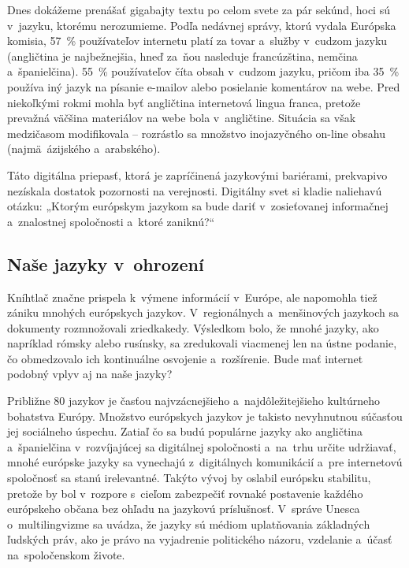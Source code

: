 \begin{multicols}{2}
Dnes dokážeme prenášať gigabajty textu po celom svete za pár
sekúnd, hoci sú v~jazyku, ktorému nerozumieme. Podľa nedávnej
správy, ktorú vydala Európska komisia, 57~\% používateľov
internetu platí za tovar a~služby v~cudzom jazyku (angličtina je
najbežnejšia, hneď za~ňou nasleduje francúzština, nemčina
a~španielčina). 55~\% používateľov číta obsah v~cudzom jazyku,
pričom iba 35~\% používa iný jazyk na písanie e-mailov alebo
posielanie komentárov na webe\cite{EC1}. Pred
niekoľkými rokmi mohla byť angličtina internetová lingua franca,
pretože prevažná väčšina materiálov na webe bola v~angličtine.
Situácia sa však medzičasom modifikovala – rozrástlo sa množstvo
inojazyčného on-line obsahu (najmä~ázijského a~arabského).

Táto digitálna priepasť, ktorá je zapríčinená jazykovými
bariérami, prekvapivo nezískala dostatok pozornosti na verejnosti.
Digitálny svet si kladie naliehavú otázku: „Ktorým európskym
jazykom sa bude dariť v~zosieťovanej informačnej a~znalostnej
spoločnosti a~ktoré zaniknú?“

\subsection{Naše jazyky v~ohrození}
Kníhtlač značne prispela k~výmene informácií v~Európe, ale napomohla tiež zániku mnohých európskych jazykov. V~regionálnych a~menšinových jazykoch sa dokumenty rozmnožovali zriedkakedy. Výsledkom bolo, že mnohé jazyky, ako napríklad rómsky alebo rusínsky, sa zredukovali viacmenej len na ústne podanie, čo obmedzovalo ich kontinuálne osvojenie a~rozšírenie. Bude mať internet podobný vplyv aj na naše jazyky?


Približne 80 jazykov je časťou najvzácnejšieho a~najdôležitejšieho kultúrneho bohatstva Európy. Množstvo európskych jazykov je takisto nevyhnutnou súčasťou jej sociálneho úspechu\cite{EC2}. Zatiaľ čo sa budú populárne jazyky ako angličtina a~španielčina v~rozvíjajúcej sa digitálnej spoločnosti a~na~trhu určite udržiavať, mnohé európske jazyky sa vynechajú z~digitálnych komunikácií a~pre internetovú spoločnosť sa stanú irelevantné. Takýto vývoj by oslabil európsku stabilitu, pretože by bol v~rozpore  s~cieľom zabezpečiť rovnaké postavenie každého európskeho občana bez ohľadu na jazykovú príslušnosť. V~správe Unesca o~multilingvizme sa uvádza, že jazyky sú médiom uplatňovania základných ľudských práv, ako je právo na vyjadrenie politického názoru, vzdelanie a~účasť na~spoločenskom živote\cite{Unesco1}.


\end{multicols}
